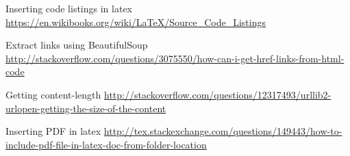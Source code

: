 %
%

%
% 
% 
%
\begin{thebibliography}{99.}
%
%
%





\bibitem{} Inserting code listings in latex {\url{https://en.wikibooks.org/wiki/LaTeX/Source_Code_Listings}}

\bibitem{} Extract links using BeautifulSoup {\url{http://stackoverflow.com/questions/3075550/how-can-i-get-href-links-from-html-code}}

\bibitem{} Getting content-length {\url{http://stackoverflow.com/questions/12317493/urllib2-urlopen-getting-the-size-of-the-content}}

\bibitem{} Inserting PDF in latex {\url{http://tex.stackexchange.com/questions/149443/how-to-include-pdf-file-in-latex-doc-from-folder-location}}

\end{thebibliography}
